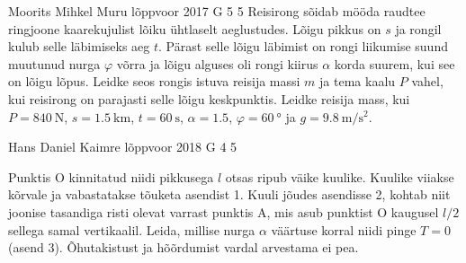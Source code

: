 \documentclass[11pt, twoside]{article}
\begin{document}
{%
{Moorits Mihkel Muru} %
{lõppvoor} %
{2017} %
{G 5} %
{5} %
{
\ifStatement
Reisirong sõidab mööda raudtee ringjoone kaarekujulist lõiku ühtlaselt aeglustudes. Lõigu pikkus on $s$ ja rongil kulub selle läbimiseks aeg $t$. Pärast selle lõigu läbimist on rongi liikumise suund muutunud nurga $\varphi$ võrra ja lõigu alguses oli rongi kiirus $\alpha$ korda suurem, kui see on lõigu lõpus. Leidke seos rongis istuva reisija massi $m$ ja tema kaalu $P$ vahel, kui reisirong on parajasti selle lõigu keskpunktis. Leidke reisija mass, kui $P=\SI{840}{\newton}$, $s=\SI{1.5}{\kilo\meter}$, $t=\SI{60}{\second}$, $\alpha=\num{1.5}$, $\varphi=\SI{60}{\degree}$ ja $g=\SI{9.8}{\meter\per\second\squared}$.
\fi
}

{Hans Daniel Kaimre} %
{lõppvoor} %
{2018} %
{G 4} %
{5} %
{
\ifStatement
\begin{figure}
\vspace{-5pt}
\end{figure}

Punktis O kinnitatud niidi pikkusega $l$ otsas ripub väike kuulike. Kuulike viiakse kõrvale ja vabastatakse tõuketa asendist 1. Kuuli jõudes asendisse 2, kohtab niit joonise tasandiga risti olevat varrast punktis A, mis asub punktist O kaugusel $l/2$ sellega samal vertikaalil. Leida, millise nurga $\alpha$ väärtuse korral niidi pinge $T=0$ (asend 3). Õhutakistust ja hõõrdumist vardal arvestama ei pea.
\fi
}

}
\end{document}

